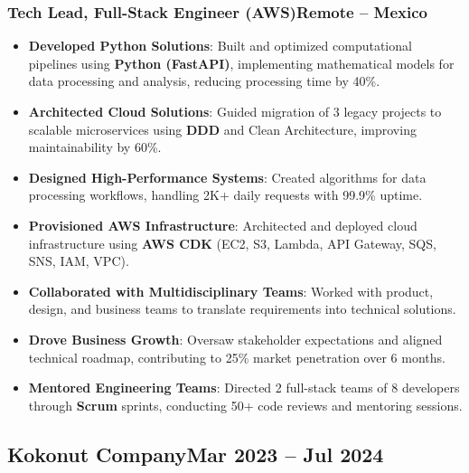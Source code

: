\documentclass[a4paper,10pt]{article}
\newcommand{\kw}[1]{\textbf{\textcolor{keyword}{#1}}}
\newcommand{\tech}[1]{\textbf{\textcolor{tech}{#1}}}
\begin{document}
\subsubsection*{\small Tech Lead, Full-Stack Engineer (AWS)\hfill Remote -- Mexico}
\begin{itemize}[noitemsep, leftmargin=*]
    \item \textbf{Developed Python Solutions}: Built and optimized computational pipelines using \tech{Python (FastAPI)}, implementing mathematical models for data processing and analysis, reducing processing time by 40\%.
    \item \textbf{Architected Cloud Solutions}: Guided migration of 3 legacy projects to scalable microservices using \kw{DDD} and Clean Architecture, improving maintainability by 60\%.
    \item \textbf{Designed High-Performance Systems}: Created algorithms for data processing workflows, handling 2K+ daily requests with 99.9\% uptime.
    \item \textbf{Provisioned AWS Infrastructure}: Architected and deployed cloud infrastructure using \tech{AWS CDK} (EC2, S3, Lambda, API Gateway, SQS, SNS, IAM, VPC).
    \item \textbf{Collaborated with Multidisciplinary Teams}: Worked with product, design, and business teams to translate requirements into technical solutions.
    \item \textbf{Drove Business Growth}: Oversaw stakeholder expectations and aligned technical roadmap, contributing to 25\% market penetration over 6 months.
    \item \textbf{Mentored Engineering Teams}: Directed 2 full-stack teams of 8 developers through \kw{Scrum} sprints, conducting 50+ code reviews and mentoring sessions.
\end{itemize}

\subsection*{\small Kokonut Company\hfill\textbf{Mar 2023 -- Jul 2024}}
\end{document}
